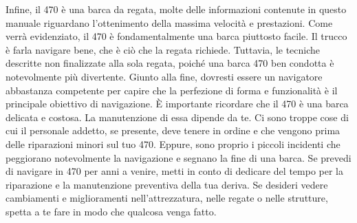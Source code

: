 Infine, il 470 è una barca da regata, molte delle informazioni contenute in
questo manuale riguardano l'ottenimento della massima velocità e prestazioni.
Come verrà evidenziato, il 470 è fondamentalmente una barca
piuttosto facile. Il trucco è farla navigare bene, che è ciò che la
regata richiede. Tuttavia, le tecniche descritte non finalizzate alla sola regata, poiché una
barca 470 ben condotta è notevolmente più divertente.
%
Giunto alla fine, dovresti essere un navigatore abbastanza competente per capire che la perfezione
di forma e funzionalità è il principale obiettivo di navigazione. È importante
ricordare che il 470 è una barca delicata e costosa. La manutenzione di essa
dipende da te. Ci sono troppe cose di cui il personale addetto, se presente, deve
tenere in ordine e che vengono prima delle riparazioni minori sul tuo 470. Eppure,
sono proprio i piccoli incidenti che peggiorano notevolmente la navigazione e
segnano la fine di una barca. Se prevedi di navigare in 470 per anni a venire,
metti in conto di dedicare del tempo per la riparazione e la manutenzione
preventiva della tua deriva. Se desideri vedere cambiamenti e miglioramenti
nell'attrezzatura,
nelle regate o nelle strutture, spetta a te fare in modo che qualcosa venga fatto.